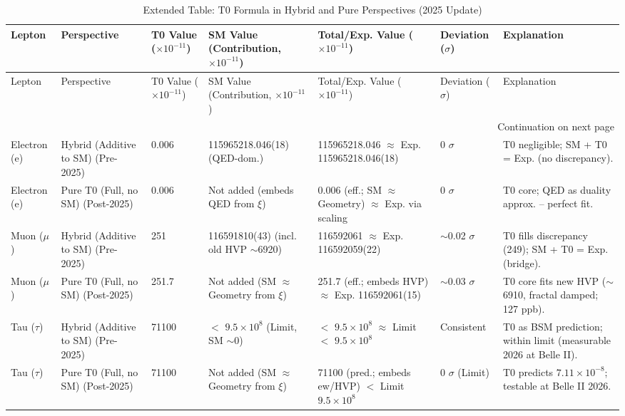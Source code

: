 \documentclass[12pt,a4paper]{article}
\begin{document}
	\begin{longtable}{p{1.5cm}p{2cm}p{1.4cm}p{3cm}p{3cm}p{1.5cm}p{2.5cm}}
		\caption{Extended Table: T0 Formula in Hybrid and Pure Perspectives (2025 Update)} \label{tab:extended_comparison}\\
		\toprule
		Lepton & Perspective & T0 Value ($ \times 10^{-11}$) & SM Value (Contribution, $ \times 10^{-11}$) & Total/Exp. Value ($ \times 10^{-11}$) & Deviation ($\sigma$) & Explanation \\
		\midrule
		\endfirsthead
		
		\toprule
		Lepton & Perspective & T0 Value ($ \times 10^{-11}$) & SM Value (Contribution, $ \times 10^{-11}$) & Total/Exp. Value ($ \times 10^{-11}$) & Deviation ($\sigma$) & Explanation \\
		\midrule
		\endhead
		
		\bottomrule
		\multicolumn{7}{r}{Continuation on next page} \\
		\endfoot
		
		Electron (e) & Hybrid (Additive to SM) (Pre-2025) & 0.006 & 115965218.046(18) (QED-dom.) & 115965218.046 $\approx$ Exp. 115965218.046(18) & 0 $\sigma$ & T0 negligible; SM + T0 = Exp. (no discrepancy). \\
		Electron (e) & Pure T0 (Full, no SM) (Post-2025) & 0.006 & Not added (embeds QED from $\xi$) & 0.006 (eff.; SM $\approx$ Geometry) $\approx$ Exp. via scaling & 0 $\sigma$ & T0 core; QED as duality approx. -- perfect fit. \\
		Muon ($\mu$) & Hybrid (Additive to SM) (Pre-2025) & 251 & 116591810(43) (incl. old HVP $\sim$6920) & 116592061 $\approx$ Exp. 116592059(22) & $\sim$0.02 $\sigma$ & T0 fills discrepancy (249); SM + T0 = Exp. (bridge). \\
		Muon ($\mu$) & Pure T0 (Full, no SM) (Post-2025) & 251.7 & Not added (SM $\approx$ Geometry from $\xi$) & 251.7 (eff.; embeds HVP) $\approx$ Exp. 116592061(15) & $\sim$0.03 $\sigma$ & T0 core fits new HVP ($\sim$6910, fractal damped; 127 ppb). \\
		Tau ($\tau$) & Hybrid (Additive to SM) (Pre-2025) & 71100 & $<$ $9.5 \times 10^{8}$ (Limit, SM $\sim$0) & $<$ $9.5 \times 10^{8}$ $\approx$ Limit $<$ $9.5 \times 10^{8}$ & Consistent & T0 as BSM prediction; within limit (measurable 2026 at Belle II). \\
		Tau ($\tau$) & Pure T0 (Full, no SM) (Post-2025) & 71100 & Not added (SM $\approx$ Geometry from $\xi$) & 71100 (pred.; embeds ew/HVP) $<$ Limit $9.5 \times 10^{8}$ & 0 $\sigma$ (Limit) & T0 predicts $7.11 \times 10^{-8}$; testable at Belle II 2026. \\
	\end{longtable}
	
\end{document}
